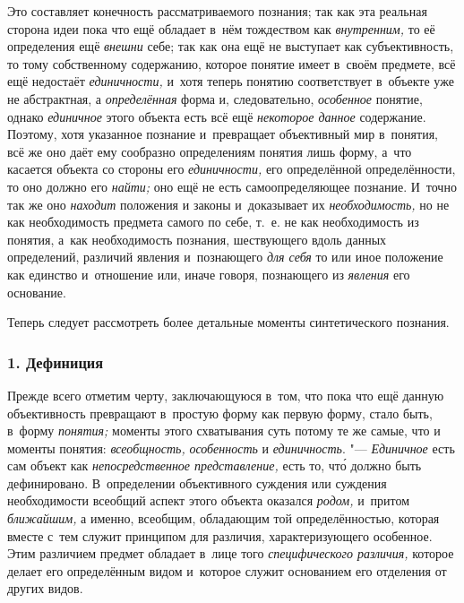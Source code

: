 Это составляет конечность рассматриваемого познания; так как
эта реальная сторона идеи пока что ещё обладает в~нём тождеством как
{\em внутренним,} то её
определения ещё {\em внешни}
себе; так как она ещё не выступает как субъективность, то
тому собственному содержанию, которое понятие имеет в~своём предмете, всё
ещё недостаёт {\em единичности,}
и~хотя теперь понятию соответствует в~объекте уже не
абстрактная, а {\em определённая}
форма и, следовательно,
{\em особенное} понятие,
однако {\em единичное}
этого объекта есть всё ещё
{\em некоторое данное}
содержание. Поэтому, хотя указанное познание и~превращает
объективный мир в~понятия, всё же оно даёт ему сообразно
определениям понятия лишь форму, а~что касается объекта со стороны его
{\em единичности,} его
определённой определённости, то оно должно его
{\em найти;} оно ещё не
есть самоопределяющее познание. И~точно так же оно
{\em находит} положения и
законы и~доказывает их
{\em необходимость,} но
не как необходимость предмета самого по себе, т.~е. не как необходимость из
понятия, а~как необходимость познания, шествующего вдоль данных
определений, различий явления и~познающего
{\em для себя} то или
иное положение как единство и~отношение или, иначе говоря, познающего из
{\em явления} его
основание.

Теперь следует рассмотреть более детальные моменты синтетического познания.

\subsubsection[1. Дефиниция]{\bfseries 1. Дефиниция}

Прежде всего отметим черту, заключающуюся в~том, что пока что
ещё данную объективность превращают в~простую форму как первую форму, стало
быть, в~форму {\em понятия;}
моменты этого схватывания суть потому те же самые, что и
моменты понятия: {\em всеобщность,}
{\em особенность} и
{\em единичность}. "---
{\em Единичное} есть сам
объект как {\em непосредственное
представление,} есть то, чт\'{о} должно быть дефинировано.
В~определении объективного суждения или суждения необходимости всеобщий
аспект этого объекта оказался
{\em родом,} и~притом
{\em ближайшим,} а
именно, всеобщим, обладающим той определённостью, которая вместе с~тем
служит принципом для различия, характеризующего особенное. Этим различием
предмет обладает в~лице того
{\em специфического различия,}
которое делает его определённым видом и~которое служит
основанием его отделения от других видов.

